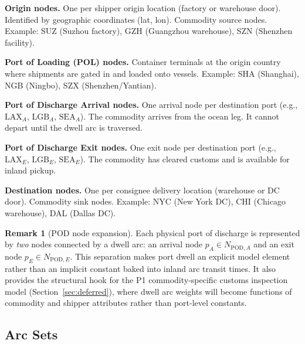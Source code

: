 \documentclass[11pt,a4paper]{article}
\theoremstyle{definition}
\newtheorem{remark}{Remark}
\begin{document}
\begin{description}[style=nextline, leftmargin=3cm, labelwidth=2.8cm]
  \item[$N_O$] \textbf{Origin nodes.} One per shipper origin location (factory or warehouse
        door). Identified by geographic coordinates (lat, lon). Commodity source nodes.
        Example: SUZ (Suzhou factory), GZH (Guangzhou warehouse), SZN (Shenzhen facility).

  \item[$N_{\text{POL}}$] \textbf{Port of Loading (POL) nodes.} Container terminals at the
        origin country where shipments are gated in and loaded onto vessels. Example: SHA
        (Shanghai), NGB (Ningbo), SZX (Shenzhen/Yantian).

  \item[$N_{\text{POD},A}$] \textbf{Port of Discharge Arrival nodes.} One arrival node per
        destination port (e.g., $\text{LAX}_A$, $\text{LGB}_A$, $\text{SEA}_A$). The
        commodity arrives from the ocean leg. It cannot depart until the dwell arc is traversed.

  \item[$N_{\text{POD},E}$] \textbf{Port of Discharge Exit nodes.} One exit node per
        destination port (e.g., $\text{LAX}_E$, $\text{LGB}_E$, $\text{SEA}_E$). The
        commodity has cleared customs and is available for inland pickup.

  \item[$N_D$] \textbf{Destination nodes.} One per consignee delivery location (warehouse
        or DC door). Commodity sink nodes.
        Example: NYC (New York DC), CHI (Chicago warehouse), DAL (Dallas DC).
\end{description}

\begin{remark}[POD node expansion]
Each physical port of discharge is represented by \emph{two} nodes connected by a
dwell arc: an arrival node $p_A \in N_{\text{POD},A}$ and an exit node
$p_E \in N_{\text{POD},E}$. This separation makes port dwell an explicit model
element rather than an implicit constant baked into inland arc transit times.
It also provides the structural hook for the P1 commodity-specific customs
inspection model (Section~\ref{sec:deferred}), where dwell arc weights will
become functions of commodity and shipper attributes rather than port-level constants.
\end{remark}

\subsection{Arc Sets}
\end{document}
